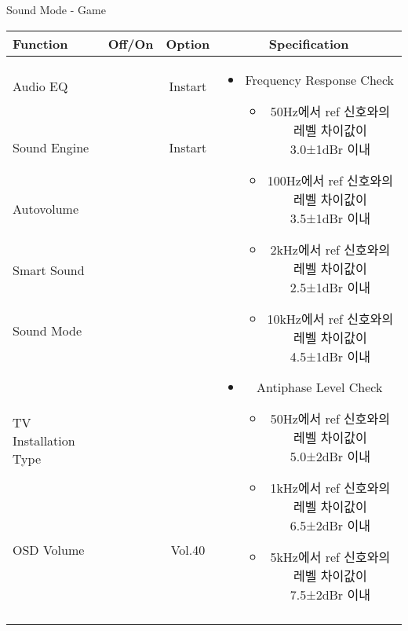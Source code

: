 \begin{frame}[t]{Sound Mode - Game}
\begin{tiny}
\begin{tabular}{@{}lccc@{}}
\toprule
Function & Off/On & Option & Specification \\
\midrule
Audio EQ & \color{black}{Off} & Instart &
\multirow{10}{60mm}{
\begin{itemize}
\item Frequency Response Check
	\begin{itemize}
	\item 50Hz에서 ref 신호와의 레벨 차이값이 3.0±1dBr 이내
	\item 100Hz에서 ref 신호와의 레벨 차이값이 3.5±1dBr 이내
	\item 2kHz에서 ref 신호와의 레벨 차이값이 2.5±1dBr 이내
	\item 10kHz에서 ref 신호와의 레벨 차이값이 4.5±1dBr 이내
	\end{itemize}
\item Antiphase Level Check
	\begin{itemize}
	\item 50Hz에서 ref 신호와의 레벨 차이값이 5.0±2dBr 이내
	\item 1kHz에서 ref 신호와의 레벨 차이값이 6.5±2dBr 이내
	\item 5kHz에서 ref 신호와의 레벨 차이값이 7.5±2dBr 이내
	\end{itemize}
\end{itemize}
} \\
Sound Engine & \color{blue}{On} & Instart & \\
Autovolume & \color{black}{Off} & & \\
Smart Sound & \color{black}{Off} & & \\
Sound Mode & \color{blue}{On} & \color{blue}{Game} & \\
TV Installation Type & \color{blue}{On} & \color{black}{Standtype1} & \\
OSD Volume & \color{blue}{On} & Vol.40 & \\
& & & \\
& & & \\
& & & \\
& & & \\
\midrule
\end{tabular}
\end{tiny}


\end{frame}

